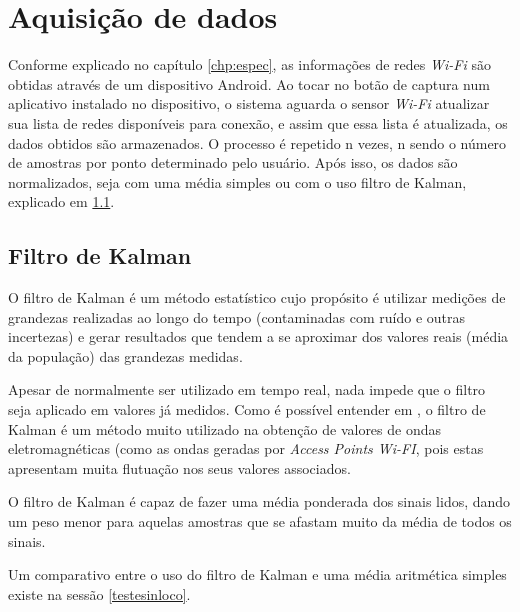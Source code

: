 \section{Aquisição de dados}

Conforme explicado no capítulo \ref{chp:espec}, as informações de redes \textit{Wi-Fi} são obtidas através de um dispositivo Android. Ao tocar no botão de captura num aplicativo instalado no dispositivo, o sistema aguarda o sensor \textit{Wi-Fi} atualizar sua lista de redes disponíveis para conexão, e assim que essa lista é atualizada, os dados obtidos são armazenados. O processo é repetido n vezes, n sendo o número de amostras por ponto determinado pelo usuário. Após isso, os dados são normalizados, seja com uma média simples ou com o uso filtro de Kalman, explicado em \ref{kalman}.

\subsection{Filtro de Kalman}
\label{kalman}
O filtro de Kalman é um método estatístico cujo propósito é utilizar medições de grandezas realizadas ao longo do tempo (contaminadas com ruído e outras incertezas) e gerar resultados que tendem a se aproximar dos valores reais (média da população) das grandezas medidas.
\par
Apesar de normalmente ser utilizado em tempo real, nada impede que o filtro seja aplicado em valores já medidos. Como é possível entender em \cite{7471364}, o filtro de Kalman é um método muito utilizado na obtenção de valores de ondas eletromagnéticas (como as ondas geradas por \textit{Access Points Wi-FI}, pois estas apresentam muita flutuação nos seus valores associados.
\par
O filtro de Kalman é capaz de fazer uma média ponderada dos sinais lidos, dando um peso menor para aquelas amostras que se afastam muito da média de todos os sinais.
\par Um comparativo entre o uso do filtro de Kalman e uma média aritmética simples existe na sessão \ref{testesinloco}.

